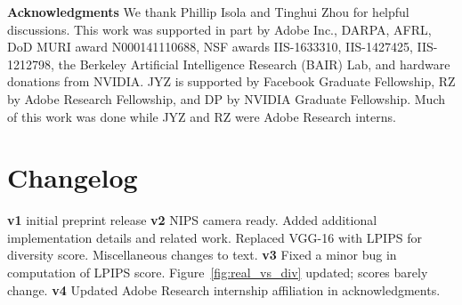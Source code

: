 \documentclass{article}
\begin{document}
{\bf Acknowledgments}
\small We thank Phillip Isola and Tinghui Zhou for helpful discussions. 
This work was supported in part by Adobe Inc., DARPA, AFRL, DoD MURI award N000141110688, NSF awards IIS-1633310, IIS-1427425, IIS-1212798, the Berkeley Artificial Intelligence Research (BAIR) Lab, and hardware donations from NVIDIA. JYZ is supported by Facebook Graduate Fellowship, RZ by Adobe Research Fellowship, and DP by NVIDIA Graduate Fellowship. Much of this work was done while JYZ and RZ were Adobe Research interns.
 
\section*{Changelog}
\small
\textbf{v1} initial preprint release
\textbf{v2} NIPS camera ready. Added additional implementation details and related work. Replaced VGG-16 with LPIPS for diversity score. Miscellaneous changes to text.
\textbf{v3} Fixed a minor bug in computation of LPIPS score. Figure~\ref{fig:real_vs_div} updated; scores barely change.
\textbf{v4} Updated Adobe Research internship affiliation in acknowledgments.
 


\end{document}
